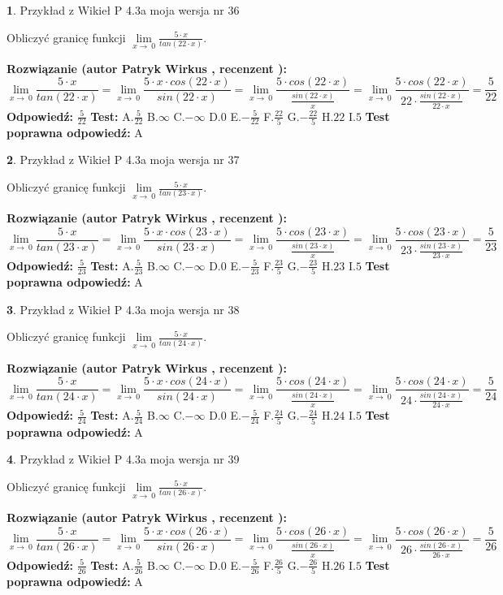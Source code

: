 \documentclass[12pt, a4paper]{article}
\theoremstyle{definition} %
\newtheorem{zad}{}
\newcommand{\zadStart}[1]{\begin{zad}#1\newline}
\newcommand{\zadStop}{\end{zad}}
\newcommand{\rozwStart}[2]{\noindent \textbf{Rozwiązanie (autor #1 , recenzent #2): }\newline}
\newcommand{\rozwStop}{\newline}
\newcommand{\odpStart}{\noindent \textbf{Odpowiedź:}\newline}
\newcommand{\odpStop}{\newline}
\newcommand{\testStart}{\noindent \textbf{Test:}\newline}
\newcommand{\testStop}{\newline}
\newcommand{\kluczStart}{\noindent \textbf{Test poprawna odpowiedź:}\newline}
\newcommand{\kluczStop}{\newline}
\begin{document}
\zadStart{Przykład z Wikieł P 4.3a moja wersja nr 36}


Obliczyć granicę funkcji $\lim\limits_{x\to\ 0}\frac{5 \cdot x}{tan(22 \cdot x)}$.
\zadStop
\rozwStart{Patryk Wirkus}{}
$$\lim\limits_{x\to\ 0}\frac{5 \cdot x}{tan(22 \cdot x)}=\lim\limits_{x\to\ 0}\frac{5 \cdot x \cdot cos(22 \cdot x)}{sin(22 \cdot x)}=\lim\limits_{x\to\ 0}\frac{5 \cdot cos(22 \cdot x)}{\frac{sin(22 \cdot x)}{x}}=\lim\limits_{x\to\ 0}\frac{5 \cdot cos(22 \cdot x)}{22 \cdot \frac{sin(22 \cdot x)}{22 \cdot x}} = \frac{5}{22}$$
\rozwStop
\odpStart
$\frac{5}{22}$
\odpStop
\testStart
A.$\frac{5}{22}$
B.$\infty$
C.$-\infty$
D.$0$
E.$-\frac{5}{22}$
F.$\frac{22}{5}$
G.$-\frac{22}{5}$
H.$22$
I.$5$
\testStop
\kluczStart
A
\kluczStop



\zadStart{Przykład z Wikieł P 4.3a moja wersja nr 37}


Obliczyć granicę funkcji $\lim\limits_{x\to\ 0}\frac{5 \cdot x}{tan(23 \cdot x)}$.
\zadStop
\rozwStart{Patryk Wirkus}{}
$$\lim\limits_{x\to\ 0}\frac{5 \cdot x}{tan(23 \cdot x)}=\lim\limits_{x\to\ 0}\frac{5 \cdot x \cdot cos(23 \cdot x)}{sin(23 \cdot x)}=\lim\limits_{x\to\ 0}\frac{5 \cdot cos(23 \cdot x)}{\frac{sin(23 \cdot x)}{x}}=\lim\limits_{x\to\ 0}\frac{5 \cdot cos(23 \cdot x)}{23 \cdot \frac{sin(23 \cdot x)}{23 \cdot x}} = \frac{5}{23}$$
\rozwStop
\odpStart
$\frac{5}{23}$
\odpStop
\testStart
A.$\frac{5}{23}$
B.$\infty$
C.$-\infty$
D.$0$
E.$-\frac{5}{23}$
F.$\frac{23}{5}$
G.$-\frac{23}{5}$
H.$23$
I.$5$
\testStop
\kluczStart
A
\kluczStop



\zadStart{Przykład z Wikieł P 4.3a moja wersja nr 38}


Obliczyć granicę funkcji $\lim\limits_{x\to\ 0}\frac{5 \cdot x}{tan(24 \cdot x)}$.
\zadStop
\rozwStart{Patryk Wirkus}{}
$$\lim\limits_{x\to\ 0}\frac{5 \cdot x}{tan(24 \cdot x)}=\lim\limits_{x\to\ 0}\frac{5 \cdot x \cdot cos(24 \cdot x)}{sin(24 \cdot x)}=\lim\limits_{x\to\ 0}\frac{5 \cdot cos(24 \cdot x)}{\frac{sin(24 \cdot x)}{x}}=\lim\limits_{x\to\ 0}\frac{5 \cdot cos(24 \cdot x)}{24 \cdot \frac{sin(24 \cdot x)}{24 \cdot x}} = \frac{5}{24}$$
\rozwStop
\odpStart
$\frac{5}{24}$
\odpStop
\testStart
A.$\frac{5}{24}$
B.$\infty$
C.$-\infty$
D.$0$
E.$-\frac{5}{24}$
F.$\frac{24}{5}$
G.$-\frac{24}{5}$
H.$24$
I.$5$
\testStop
\kluczStart
A
\kluczStop



\zadStart{Przykład z Wikieł P 4.3a moja wersja nr 39}


Obliczyć granicę funkcji $\lim\limits_{x\to\ 0}\frac{5 \cdot x}{tan(26 \cdot x)}$.
\zadStop
\rozwStart{Patryk Wirkus}{}
$$\lim\limits_{x\to\ 0}\frac{5 \cdot x}{tan(26 \cdot x)}=\lim\limits_{x\to\ 0}\frac{5 \cdot x \cdot cos(26 \cdot x)}{sin(26 \cdot x)}=\lim\limits_{x\to\ 0}\frac{5 \cdot cos(26 \cdot x)}{\frac{sin(26 \cdot x)}{x}}=\lim\limits_{x\to\ 0}\frac{5 \cdot cos(26 \cdot x)}{26 \cdot \frac{sin(26 \cdot x)}{26 \cdot x}} = \frac{5}{26}$$
\rozwStop
\odpStart
$\frac{5}{26}$
\odpStop
\testStart
A.$\frac{5}{26}$
B.$\infty$
C.$-\infty$
D.$0$
E.$-\frac{5}{26}$
F.$\frac{26}{5}$
G.$-\frac{26}{5}$
H.$26$
I.$5$
\testStop
\kluczStart
A
\kluczStop
\end{document}
